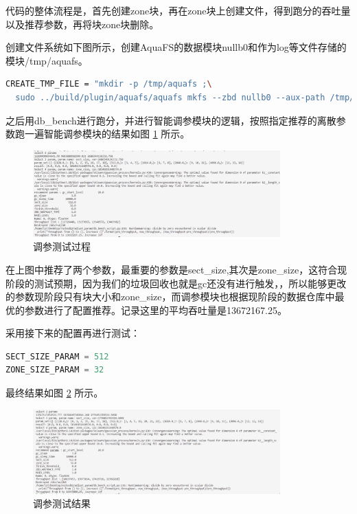 代码的整体流程是，首先创建zone块，再在zone块上创建文件，得到跑分的吞吐量以及推荐参数，再将块zone块删除。

创建文件系统如下图所示，创建AquaFS的数据模块nullb0和作为log等文件存储的模块/tmp/aquafs。

\begin{lstlisting}[language=bash]
  CREATE_TMP_FILE = "mkdir -p /tmp/aquafs ;\
  sudo ../build/plugin/aquafs/aquafs mkfs --zbd nullb0 --aux-path /tmp/aquafs"
\end{lstlisting}

之后用db\_bench进行跑分，并进行智能调参模块的逻辑，按照指定推荐的离散参数跑一遍智能调参模块的结果如图 \ref{test-turnner2} 所示。

\begin{figure}[htbp]
  \centering
  \includegraphics[width=0.85\textwidth]{fig/turnner2}
  \caption{ 调参测试过程 }
  \label{test-turnner2}
\end{figure}

在上图中推荐了两个参数，最重要的参数是sect\_size,其次是zone\_size，这符合现阶段的测试预期，因为我们的垃圾回收也就是gc还没有进行触发，，所以能够更改的参数现阶段只有块大小和zone\_size，而调参模块也根据现阶段的数据仓库中最优的参数进行了配置推荐。记录这里的平均吞吐量是13672167.25。

采用接下来的配置再进行测试：

\begin{lstlisting}[language=Python]
SECT_SIZE_PARAM = 512
ZONE_SIZE_PARAM = 32
\end{lstlisting}

最终结果如图 \ref{test-turnner3} 所示。

\begin{figure}[htbp]
  \centering
  \includegraphics[width=0.85\textwidth]{fig/turnner3}
  \caption{ 调参测试结果 }
  \label{test-turnner3}
\end{figure}

